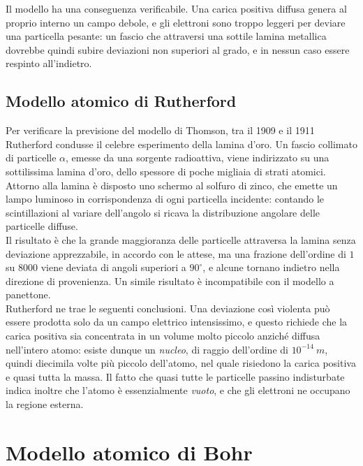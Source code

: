 Il modello ha una conseguenza verificabile. Una carica positiva diffusa genera 
al proprio interno un campo debole, e gli elettroni sono troppo leggeri per 
deviare una particella pesante: un fascio che attraversi una sottile lamina 
metallica dovrebbe quindi subire deviazioni non superiori al grado, e in nessun 
caso essere respinto all'indietro.

\subsection{Modello atomico di Rutherford}

Per verificare la previsione del modello di Thomson, tra il 1909 e il 1911 Rutherford condusse il celebre esperimento della lamina d'oro. 
Un  fascio collimato di particelle $\alpha$, emesse da una sorgente radioattiva, viene indirizzato su una sottilissima lamina d'oro, dello spessore di poche migliaia di strati atomici. 
Attorno alla lamina è disposto uno schermo al solfuro di zinco, che emette un lampo luminoso in corrispondenza di ogni particella incidente: contando le scintillazioni al variare dell'angolo si ricava la distribuzione angolare delle particelle diffuse.\\

Il risultato è che la grande maggioranza delle particelle attraversa la lamina senza deviazione apprezzabile, in accordo con le attese, ma una frazione dell'ordine di $1$ su $8000$ viene deviata di angoli superiori a $90^\circ$, e alcune tornano indietro nella direzione di provenienza. 
Un simile risultato è incompatibile con il modello a panettone.\\

Rutherford ne trae le seguenti conclusioni. Una deviazione così violenta può essere prodotta solo da un campo elettrico intensissimo, e questo richiede che la carica positiva sia concentrata in un volume molto piccolo anziché diffusa nell'intero atomo: esiste dunque un \emph{nucleo}, di raggio dell'ordine di $10^{-14} \ m$, quindi diecimila volte più piccolo dell'atomo, nel quale risiedono la carica positiva e quasi tutta la massa. 
Il fatto che quasi tutte le particelle passino indisturbate indica inoltre che l'atomo è essenzialmente \emph{vuoto}, e che gli elettroni ne occupano la regione esterna.

\newpage

\section{Modello atomico di Bohr}

